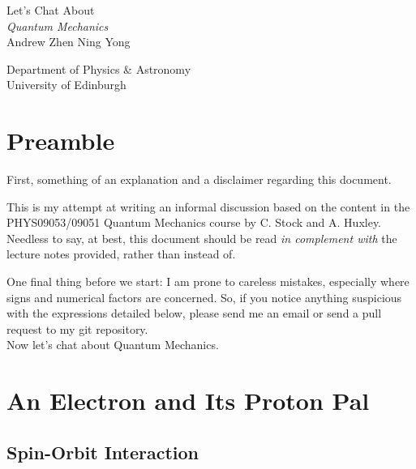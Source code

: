 \documentclass{article}
\numberwithin{equation}{section} %
\begin{document}
\begin{titlepage}
\begin{center}
\vspace*{1.5cm}

{\large Let's Chat About \\ \vspace{0.25cm}\LARGE \textit{Quantum Mechanics}}\\
\vspace{3cm}
Andrew Zhen Ning Yong\\
\vspace{0.25cm}

Department of Physics \& Astronomy\\
University of Edinburgh

\vspace{7cm}


\end{center}
\end{titlepage}

\tableofcontents

\newpage

\section{Preamble}
First, something of an explanation and a disclaimer regarding this document.

This is my attempt at writing an informal discussion based on the content in the PHYS09053/09051 Quantum Mechanics course by C. Stock and A. Huxley. Needless to say, at best, this document should be read \textit{in complement with} the lecture notes provided, rather than instead of. 

One final thing before we start: I am prone to careless mistakes, especially where signs and numerical factors are concerned. So, if you notice anything suspicious with the expressions detailed below, please send me an email or send a pull request to my git repository.\\

\noindent Now let's chat about Quantum Mechanics.

\section{An Electron and Its Proton Pal}
\subsection{Spin-Orbit Interaction}
\end{document}
